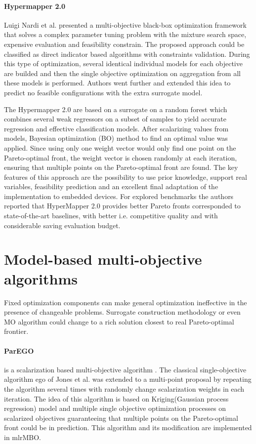         \paragraph{Hypermapper 2.0} Luigi Nardi et al. \cite{nardi2019practical} presented a multi-objective black-box optimization framework that solves a complex parameter tuning problem with the mixture search space, expensive evaluation and feasibility constrain.
        The proposed approach could be classified as direct indicator based algorithms with constraints validation. During this type of optimization, several identical individual models for each objective are builded and then the single objective optimization on aggregation from all these models is performed. Authors went further and extended this idea to predict no feasible configurations with the extra surrogate model.
        
        The Hypermapper 2.0 are based on a surrogate on a random forest which combines several weak regressors on a subset of samples to yield accurate regression and effective classification models. After scalarizing values from models, Bayesian optimization (BO) method to find an optimal value was applied. Since using only one weight vector would only find one point on the Pareto-optimal front, the weight vector is chosen randomly at each iteration, ensuring that multiple points on the Pareto-optimal front are found. The key features of this approach are the possibility to use prior knowledge, support real variables, feasibility prediction and an excellent final adaptation of the implementation to embedded devices. For explored benchmarks the authors reported that HyperMapper 2.0 provides better Pareto fronts corresponded to state-of-the-art baselines, with better i.e. competitive quality and with considerable saving evaluation budget.
        

    \section{Model-based multi-objective algorithms}
        Fixed optimization components can make general optimization ineffective in the presence of changeable problems. Surrogate construction methodology or even MO algorithm could change to a rich solution closest to real Pareto-optimal frontier.

        \paragraph{ParEGO}\label{alg:ParEGO} is a scalarization based multi-objective algorithm \cite{Knowles06}. The classical single-objective algorithm \gls{ego} \cite{JonesSW98} of Jones et al. was extended to a multi-point proposal by repeating the algorithm several times with randomly change scalarization weights in each iteration.  The idea of this algorithm is based on Kriging(Gaussian process regression) model and multiple single objective optimization processes on scalarized objectives guaranteeing that multiple points on the Pareto-optimal front could be in prediction. This algorithm and its modification are implemented in mlrMBO\cite{BischlmlrMBO}.


